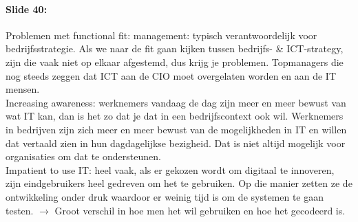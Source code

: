\documentclass[10pt,a4paper]{report}
\begin{document}
\paragraph{Slide 40:}Problemen met functional fit: management: typisch verantwoordelijk voor bedrijfsstrategie. 
Als we naar de fit gaan kijken tussen bedrijfs- \& ICT-strategy, zijn die vaak niet op elkaar afgestemd, dus krijg je problemen. Topmanagers die nog steeds zeggen dat ICT aan de CIO moet overgelaten worden en aan de IT mensen.\\
Increasing awareness: werknemers vandaag de dag zijn meer en meer bewust van wat IT kan, dan is het zo dat je dat in een bedrijfscontext ook wil. 
Werknemers in bedrijven zijn zich meer en meer bewust van de mogelijkheden in IT en willen dat vertaald zien in hun dagdagelijkse bezigheid. 
Dat is niet altijd mogelijk voor organisaties om dat te ondersteunen.\\ 
Impatient to use IT: heel vaak, als er gekozen wordt om digitaal te innoveren, zijn eindgebruikers heel gedreven om het te gebruiken. 
Op die manier zetten ze de ontwikkeling onder druk waardoor er weinig tijd is om de systemen te gaan testen. $\rightarrow$ Groot verschil in hoe men het wil gebruiken en hoe het gecodeerd is. 
\end{document}
